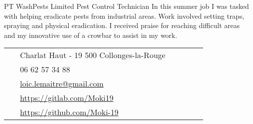 \documentclass[10pt]{article} %
\begin{document}
\begin{paracol}{2}

  {PT} %
  {WashPests Limited} %
  {Pest Control Technician} %
  {In this summer job I was tasked with helping eradicate pests from industrial areas. Work involved setting traps, spraying and physical eradication. I received praise for reaching difficult areas and my innovative use of a crowbar to assist in my work.} %


  \vspace{-\baselineskip}\medskip %

  \switchcolumn %


  \parbox[top][0.12\textheight][c]{\linewidth}{ %
    \vspace{-0.04\textheight} %
    \colorbox{shade}{ %
      \begin{supertabular}{p{0.05\linewidth}|p{0.775\linewidth}} %
        \raisebox{-1pt}{\faHome} & Charlat Haut - 19 500 Collonges-la-Rouge \\ %
        \raisebox{-1pt}{\faPhone} & 06 62 57 34 88 \\ %
        \raisebox{0pt}{\small\faEnvelope} & \href{mailto:loic.lemaitre@gmail.com}{loic.lemaitre@gmail.com} \\ %
        \raisebox{-1pt}{\small\faGitlab} & \href{https://gitlab.com/Moki19}{https://gitlab.com/Moki19} \\ %
        \raisebox{-1pt}{\small\faGithub} & \href{https://github.com/Moki-19}{https://github.com/Moki-19} \\ %
      \end{supertabular}
    }
  }


\end{paracol}
\end{document}
